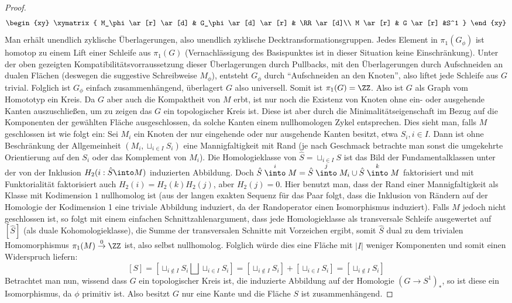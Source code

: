 \begin{proof}
	\[
	 	\begin{xy}
	 		\xymatrix{
	 			M_\phi \ar[r] \ar[d] & G_\phi \ar[d] \ar[r] & \RR \ar[d]\\
	 			M \ar[r] & G \ar[r] &S^1
	 		}
	 	\end{xy}
	 \] 
	 Man erhält unendlich zyklische Überlagerungen, also unendlich zyklische Decktransformationsgruppen. Jedes Element in $\pi_1(G_\phi)$ ist homotop zu einem Lift einer Schleife  aus $\pi_1(G)$ (Vernachlässigung des Basispunktes ist in dieser Situation keine Einschränkung). Unter der oben gezeigten Kompatibilitätsvorraussetzung dieser Überlagerungen durch Pullbacks, mit den Überlagerungen durch Aufschneiden an dualen Flächen (deswegen die suggestive Schreibweise $M_\phi$), entsteht $G_\phi$ durch "`Aufschneiden an den Knoten"', also liftet jede Schleife aus $G$ trivial. Folglich ist $G_\phi$ einfach zusammenhängend, überlagert $G$ also universell. Somit ist $\pi_1(G)= \ZZ$. Also ist $G$ als Graph vom Homototyp ein Kreis. Da $G$ aber auch die Kompaktheit von $M$ erbt, ist nur noch die Existenz von Knoten ohne ein- oder ausgehende Kanten auszuschließen, um zu zeigen das $G$ ein topologischer Kreis ist. Diese ist aber durch die Minimalitätseigenschaft im Bezug auf die Komponenten der gewählten Fläche ausgeschlossen, da solche Kanten einem nullhomologen Zykel entsprechen. Dies sieht man, falls $M$ geschlossen ist wie folgt ein: Sei $M_i$ ein Knoten der nur eingehende oder nur ausgehende Kanten besitzt, etwa $S_i, i \in I$. Dann ist ohne Beschränkung der Allgemeinheit $(M_i,\sqcup_{i\in I}S_i)$ eine Mannigfaltigkeit mit Rand (je nach Geschmack betrachte man sonst die umgekehrte Orientierung auf den $S_i$ oder das Komplement von $M_i$). Die Homologieklasse von $\hat S = \sqcup_{i \in I} S$ ist das Bild der Fundamentalklassen unter der von der Inklusion $H_2(i:\hat S \into M)$ induzierten Abbildung. Doch $ \hat S \stackrel i \into M = \hat S \stackrel j \into M_i \cup \hat S \stackrel k \into M$ faktorisiert und mit Funktorialität faktorisiert auch $H_2(i)=H_2(k)H_2(j)$, aber $H_2(j)=0$. Hier benutzt man, dass der Rand einer Mannigfaltigkeit als Klasse mit Kodimension $1$ nullhomolog ist (aus der langen exakten Sequenz für das Paar folgt, dass die Inklusion von Rändern auf der Homologie der Kodimension 1 eine triviale Abbildung induziert, da der Randoperator einen Isomorphismus induziert). Falls $M$ jedoch nicht geschlossen ist, so folgt mit einem einfachen Schnittzahlenargument, dass jede Homologieklasse als transversale Schleife ausgewertet auf $[\hat S]$ (als duale Kohomologieklasse), die Summe der transversalen Schnitte mit Vorzeichen ergibt, somit $\hat S$ dual zu dem trivialen Homomorphismus $\pi_1(M) \stackrel 0\to \ZZ$ ist, also selbst nullhomolog. Folglich würde dies eine Fläche mit $|I|$ weniger Komponenten und somit einen Widerspruch liefern:
	 \[
	 	[S]=[\sqcup_{i\not \in I} S_i\bigsqcup \sqcup_{i\in I} S_i] = [\sqcup_{i\not \in I} S_i ]+[ \sqcup_{i\in I} S_i] = [\sqcup_{i\not \in I}S_i]
	 \]
	 Betrachtet man nun, wissend dass $G$ ein topologischer Kreis ist, die induzierte Abbildung auf der Homologie $(G\to S^1)_*$, so ist diese ein Isomorphismus, da $\phi$ primitiv ist. Also besitzt $G$ nur eine Kante und die Fläche $S$ ist zusammenhängend.


\end{proof}
